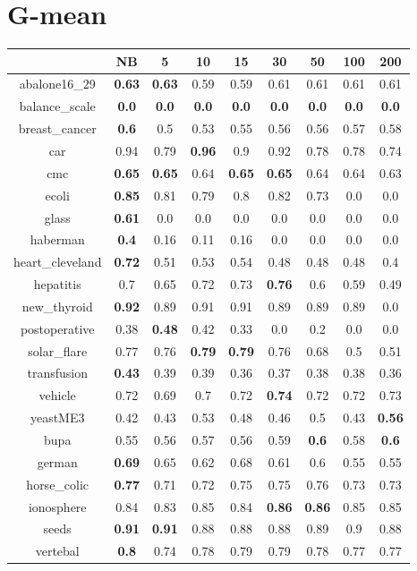 \documentclass{article}%
\begin{document}
%
\section*{G{-}mean}%
\begin{tabular}{c|cccccccc}%
\hline%
&NB&5&10&15&30&50&100&200\\%
\hline%
abalone16\_29&\textbf{0.63}&\textbf{0.63}&0.59&0.59&0.61&0.61&0.61&0.61\\%
\hline%
balance\_scale&\textbf{0.0}&\textbf{0.0}&\textbf{0.0}&\textbf{0.0}&\textbf{0.0}&\textbf{0.0}&\textbf{0.0}&\textbf{0.0}\\%
\hline%
breast\_cancer&\textbf{0.6}&0.5&0.53&0.55&0.56&0.56&0.57&0.58\\%
\hline%
car&0.94&0.79&\textbf{0.96}&0.9&0.92&0.78&0.78&0.74\\%
\hline%
cmc&\textbf{0.65}&\textbf{0.65}&0.64&\textbf{0.65}&\textbf{0.65}&0.64&0.64&0.63\\%
\hline%
ecoli&\textbf{0.85}&0.81&0.79&0.8&0.82&0.73&0.0&0.0\\%
\hline%
glass&\textbf{0.61}&0.0&0.0&0.0&0.0&0.0&0.0&0.0\\%
\hline%
haberman&\textbf{0.4}&0.16&0.11&0.16&0.0&0.0&0.0&0.0\\%
\hline%
heart\_cleveland&\textbf{0.72}&0.51&0.53&0.54&0.48&0.48&0.48&0.4\\%
\hline%
hepatitis&0.7&0.65&0.72&0.73&\textbf{0.76}&0.6&0.59&0.49\\%
\hline%
new\_thyroid&\textbf{0.92}&0.89&0.91&0.91&0.89&0.89&0.89&0.0\\%
\hline%
postoperative&0.38&\textbf{0.48}&0.42&0.33&0.0&0.2&0.0&0.0\\%
\hline%
solar\_flare&0.77&0.76&\textbf{0.79}&\textbf{0.79}&0.76&0.68&0.5&0.51\\%
\hline%
transfusion&\textbf{0.43}&0.39&0.39&0.36&0.37&0.38&0.38&0.36\\%
\hline%
vehicle&0.72&0.69&0.7&0.72&\textbf{0.74}&0.72&0.72&0.73\\%
\hline%
yeastME3&0.42&0.43&0.53&0.48&0.46&0.5&0.43&\textbf{0.56}\\%
\hline%
bupa&0.55&0.56&0.57&0.56&0.59&\textbf{0.6}&0.58&\textbf{0.6}\\%
\hline%
german&\textbf{0.69}&0.65&0.62&0.68&0.61&0.6&0.55&0.55\\%
\hline%
horse\_colic&\textbf{0.77}&0.71&0.72&0.75&0.75&0.76&0.73&0.73\\%
\hline%
ionosphere&0.84&0.83&0.85&0.84&\textbf{0.86}&\textbf{0.86}&0.85&0.85\\%
\hline%
seeds&\textbf{0.91}&\textbf{0.91}&0.88&0.88&0.88&0.89&0.9&0.88\\%
\hline%
vertebal&\textbf{0.8}&0.74&0.78&0.79&0.79&0.78&0.77&0.77\\%
\hline%
\end{tabular}

%
\end{document}

